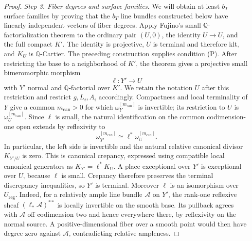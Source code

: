 \documentclass[11pt]{amsart}
\theoremstyle{definition}
\theoremstyle{remark}
\numberwithin{equation}{section}
\newcommand{\Q}{\mathbb{Q}}
\begin{document}
\begin{proof}
\emph{Step 3. Fiber degrees and surface families.}
We will obtain at least \(b_T\) surface families by proving that the
\(b_T\) line bundles constructed below have linearly independent vectors
of fiber degrees.
Apply Fujino's small \(\Q\)-factorialization theorem
\cite[Theorem~1.24]{FujinoAnalyticMMP} to the ordinary pair
\((U,0)\), the identity \(U\to U\), and the full compact \(K'\).
The identity is projective, \(U\) is terminal and therefore klt,
and \(K_U\) is \(\Q\)-Cartier.  The preceding construction supplies
condition (P).  After restricting the base to a neighborhood of
\(K'\), the theorem gives a projective small bimeromorphic morphism
\[
 \ell:Y'\longrightarrow U
\]
with \(Y'\) normal and \(\Q\)-factorial over \(K'\).  We retain the
notation \(U\) after this restriction and restrict \(g,L_i,A_i\)
accordingly.  Compactness and local terminality of \(Y\) give a common
\(m_{\mathrm{can}}>0\) for which \(\omega_Y^{[m_{\mathrm{can}}]}\) is
invertible; its restriction to \(U\) is
\(\omega_U^{[m_{\mathrm{can}}]}\).  Since \(\ell\) is
small, the natural identification on the common codimension-one open
extends by reflexivity to
\[
 \omega_{Y'}^{[m_{\mathrm{can}}]}
 \simeq\ell^*\omega_U^{[m_{\mathrm{can}}]}.
\]
In particular, the left side is invertible and the natural relative
canonical divisor \(K_{Y'/U}\) is zero.  This is canonical crepancy,
expressed using compatible local canonical generators as
\(K_{Y'}=\ell^*K_U\).  A place exceptional over \(Y'\) is exceptional
over \(U\), because \(\ell\) is small.  Crepancy therefore preserves
the terminal discrepancy inequalities, so \(Y'\) is terminal.  Moreover \(\ell\)
is an isomorphism over \(U_{\mathrm{reg}}\).  Indeed, for a relatively
ample line bundle \(\mathcal A\) on \(Y'\), the rank-one reflexive
sheaf \((\ell_*\mathcal A)^{**}\) is locally invertible on the smooth
base.  Its pullback agrees with \(\mathcal A\) off codimension two
and hence everywhere there, by reflexivity on the normal source.
A positive-dimensional fiber over a smooth point would then have
degree zero against \(\mathcal A\), contradicting relative ampleness.


\end{proof}
\end{document}
